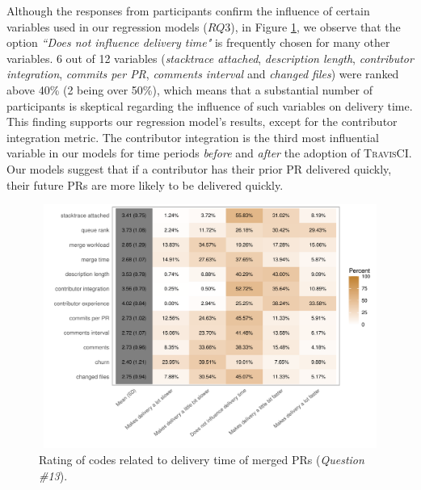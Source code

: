 Although the responses from participants confirm the influence of certain variables used in our regression models ($RQ3$), in Figure \ref{fig:factors_impact_on_delivery_time_heating}, we observe that the option \textit{``Does not influence delivery time"} is frequently chosen for many other variables. 6 out of 12 variables (\textit{stacktrace attached}, \textit{description length}, \textit{contributor integration}, \textit{commits per PR}, \textit{comments interval} and \textit{changed files}) were ranked above 40\% (2 being over 50\%), which means that a substantial number of participants is skeptical regarding the influence of such variables on delivery time. This finding supports our regression model's results, except for the contributor integration metric. The contributor integration is the third most influential variable in our models for time periods \textit{before} and \textit{after} the adoption of \textsc{TravisCI}. Our models suggest that if a contributor has their prior PR delivered quickly, their future PRs are more likely to be delivered quickly.


\begin{figure}[tbh]
	\includegraphics[height=8cm, width=12cm]{factors_impact_on_delivery_time_heating.pdf}
	\caption{Rating of codes related to delivery time of merged PRs (\textit{Question \#13}).}
	\label{fig:factors_impact_on_delivery_time_heating}       %
\end{figure}


